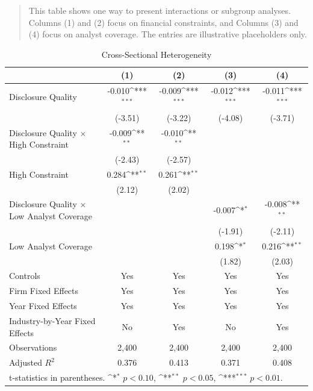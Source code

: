 \documentclass[hidelinks,12pt]{article}
\def\sym#1{\ifmmode^{#1}\else\(^{#1}\)\fi}
\newcommand{\floatnotes}[1]{%
\begin{quotation}
\noindent \scriptsize #1
\end{quotation}
}
\begin{document}
\clearpage
\begin{table}[!htbp]
\centering
\caption{Cross-Sectional Heterogeneity}
\label{tab:heterogeneity}\vspace{-2.5ex}
\floatnotes{This table shows one way to present interactions or subgroup analyses. Columns (1) and (2) focus on financial constraints, and Columns (3) and (4) focus on analyst coverage. The entries are illustrative placeholders only.}
\small
\begin{tabular}{lcccc}
\toprule
 & (1) & (2) & (3) & (4) \\
\midrule
Disclosure Quality & -0.010\sym{***} & -0.009\sym{***} & -0.012\sym{***} & -0.011\sym{***} \\
 & (-3.51) & (-3.22) & (-4.08) & (-3.71) \\
[0.5ex]
Disclosure Quality $\times$ High Constraint & -0.009\sym{**} & -0.010\sym{**} &  &  \\
 & (-2.43) & (-2.57) &  &  \\
[0.5ex]
High Constraint & 0.284\sym{**} & 0.261\sym{**} &  &  \\
 & (2.12) & (2.02) &  &  \\
[0.5ex]
Disclosure Quality $\times$ Low Analyst Coverage &  &  & -0.007\sym{*} & -0.008\sym{**} \\
 &  &  & (-1.91) & (-2.11) \\
[0.5ex]
Low Analyst Coverage &  &  & 0.198\sym{*} & 0.216\sym{**} \\
 &  &  & (1.82) & (2.03) \\
[0.5ex]
Controls & Yes & Yes & Yes & Yes \\
Firm Fixed Effects & Yes & Yes & Yes & Yes \\
Year Fixed Effects & Yes & Yes & Yes & Yes \\
Industry-by-Year Fixed Effects & No & Yes & No & Yes \\
Observations & 2,400 & 2,400 & 2,400 & 2,400 \\
Adjusted \(R^2\) & 0.376 & 0.413 & 0.371 & 0.408 \\
\bottomrule
\multicolumn{5}{l}{\footnotesize t-statistics in parentheses. \sym{*} $p<0.10$, \sym{**} $p<0.05$, \sym{***} $p<0.01$.}
\end{tabular}
\end{table}
\end{document}
